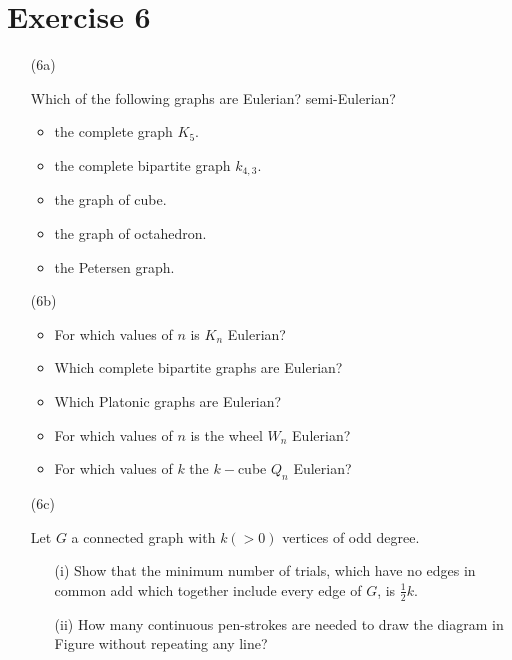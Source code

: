 \documentclass[12pt,a4paper, twocolumn]{article}
\begin{document}
\section*{Exercise 6}
\begin{itemize}
		\item[(6a)] {\color{blue} Which of the following graphs are Eulerian? semi-Eulerian?
				\begin{itemize}
						\item the complete graph $K_5$.
						\item the complete bipartite graph $k_{4,3}$.
						\item the graph of cube.
						\item the graph of octahedron.
						\item the Petersen graph.
				\end{itemize}
				}
			\hsplit
		\item[(6b)] {\color{blue} 			
				\begin{itemize}
						\item For which values of $n$ is $K_n$ Eulerian?
						\item Which complete bipartite graphs are Eulerian?
						\item Which Platonic graphs are Eulerian?
						\item For which values of $n$ is the wheel $W_n$ Eulerian?
						\item For which values of $k$ the $k-$cube $Q_n$ Eulerian?
				\end{itemize}
				}
			\hsplit
		\item[(6c)] {\color{blue} Let $G$ a connected graph with $k(>0)$ vertices of odd degree.
				\begin{itemize}
						\item[(i)] Show that the minimum number of trials, which have no edges in common add which together include every edge of $G$, is $\frac{1}{2}k$.
						\item[(ii)] How many continuous pen-strokes are needed to draw the diagram in Figure without repeating any line?
						\begin{figure}[h!]
							
						\end{figure}
				\end{itemize}
				}
\end{itemize}
\end{document}
